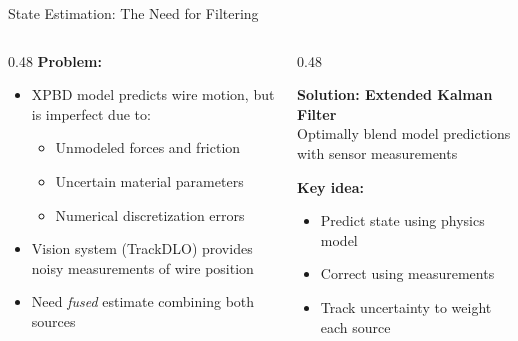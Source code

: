 \documentclass[aspectratio=169]{beamer}
\begin{document}
\begin{frame}{State Estimation: The Need for Filtering}

  \begin{columns}[T]
    \begin{column}{0.48\textwidth}
      \textbf{Problem:}
      \begin{itemize}
        \item XPBD model predicts wire motion, but is imperfect due to:
          \begin{itemize}
            \item Unmodeled forces and friction
            \item Uncertain material parameters
            \item Numerical discretization errors
          \end{itemize}
        \item Vision system (TrackDLO) provides noisy measurements of wire position
        \item Need \textit{fused} estimate combining both sources
      \end{itemize}
    \end{column}

    \begin{column}{0.48\textwidth}
      \begin{center}
        \begin{tcolorbox}[colback=lightblue!70, colframe=mainblue, arc=4pt, boxrule=1pt]
          \small\centering
          \textbf{Solution: Extended Kalman Filter}\\[6pt]
          Optimally blend model predictions with sensor measurements
        \end{tcolorbox}
      \end{center}
      \vspace{0.8em}
      \textbf{Key idea:}
      \begin{itemize}
        \item Predict state using physics model
        \item Correct using measurements
        \item Track uncertainty to weight each source
      \end{itemize}
    \end{column}
  \end{columns}

\end{frame}
\end{document}
